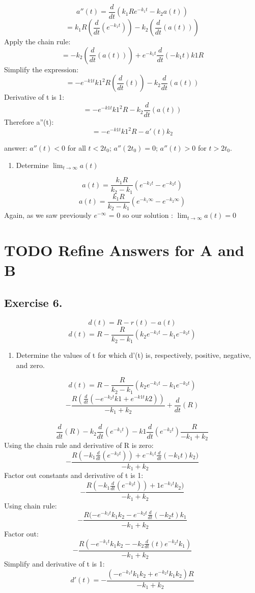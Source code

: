 \documentclass[]{article}
\providecommand{\tightlist}{%
  \setlength{\itemsep}{0pt}\setlength{\parskip}{0pt}}
\begin{document}
\[a''(t) = \frac{d}{dt}(k_1Re^{-k_1t}-k_2a(t))\]
\[=k_1 R(\frac{d}{dt}(e^{-k_1 t}))- k_2 (\frac{d}{dt}(a(t)))\] Apply the
chain rule:
\[=- k_2 (\frac{d}{dt}(a(t)))+ e^{-k_1 t}\frac{d}{dt}({-k_1 t})k1 R\]
Simplify the expression:
\[=-e^{-k1 t}k1^2 R(\frac{d}{dt}(t)) -k_2 \frac{d}{dt}({a(t)})\]
Derivative of t is 1: \[=-e^{-k1 t}k1^2 R-k_2 \frac{d}{dt}({a(t)})\]
Therefore a''(t): \[=-e^{-k1 t}k1^2 R-a'(t)k_2\]

answer: \(a''(t) < 0\) for all \(t < 2t_0\); \(a''(2t_0) =0\);
\(a''(t) > 0\) for \(t > 2t_0\).

\begin{enumerate}
\def\labelenumi{(\alph{enumi})}
\setcounter{enumi}{2}
\tightlist
\item
  Determine \(\lim_{t\to\infty}a(t)\)
\end{enumerate}

\[a(t) = \frac{k_1 R}{k_2-k_1}(e^{-k_1t} - e^{-k_2t})\]
\[a(t) = \frac{k_1 R}{k_2-k_1}(e^{-k_1 \infty} - e^{-k_2 \infty})\]
Again, as we saw previously \(e^{-\infty}\) = 0 so our solution :
\(\lim_{t\to\infty}a(t) =0\)

\section{TODO Refine Answers for A and
B}\label{todo-refine-answers-for-a-and-b-1}

\subsection{Exercise 6.}\label{exercise-6.}

\[d(t) = R - r(t) - a(t)\]
\[d(t) = R - \frac{R}{k_2 - k_1}(k_2 e ^{-k_1 t} - k_1 e^{-k_2 t})\]

\begin{enumerate}
\def\labelenumi{(\alph{enumi})}
\tightlist
\item
  Determine the values of t for which d'(t) is, respectively, positive,
  negative, and zero.
\end{enumerate}

\[d(t) = R - \frac{R}{k_2 - k_1}(k_2 e ^{-k_1 t} - k_1 e^{-k_2 t})\]
\[- \frac{R (\frac{d}{dt} (-e^{-k_2 t} k1 + e^{-k1t}k2))}{-k_1 + k_2} + \frac{d}{dt} (R)\]\\
\[\frac{d}{dt}(R) - k_2 \frac{d}{dt}(e^{-k_1 t})-k1\frac{d}{dt}(e^{-k_2 t})\frac{R}{-k_1 + k_2}\]
Using the chain rule and derivative of R is zero:
\[- \frac{R(-k_1 \frac{d}{dt}(e^{-k_2 t})) + e^{-k_1 t}\frac{d}{dt}(-k_1 t)k_2)}{-k_1 + k_2}\]
Factor out constants and derivative of t is 1:
\[- \frac{R(-k_1 \frac{d}{dt}(e^{-k_2 t})) + 1e^{-k_1 t}k_2)}{-k_1 + k_2}\]
Using chain rule:
\[- \frac{R(-e^{-k_1 t}k_1 k_2 - e^{-k_2 t} \frac{d}{dt} (-k_2 t)k_1}{-k_1 + k_2}\]
Factor out:
\[- \frac{R(-e^{-k_1 t}k_1 k_2 - -k_2 \frac{d}{dt}(t)e^{-k_2 t}k_1)}{-k_1 + k_2}\]
Simplify and derivative of t is 1:
\[d'(t) = -\frac{(-e^{-k_1 t}k_1 k_2 + e^{-k_2 t}k_1 k_2)R}{-k_1 + k_2}\]
\end{document}
